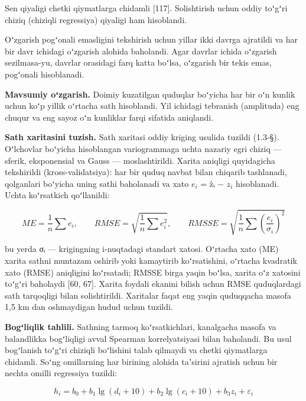 \documentclass[14pt,a4paper,oneside]{extreport}
\begin{document}
Sen qiyaligi chetki qiymatlarga chidamli {[}117{]}. Solishtirish uchun
oddiy toʻgʻri chiziq (chiziqli regressiya) qiyaligi ham hisoblandi.

Oʻzgarish pogʻonali emasligini tekshirish uchun yillar ikki davrga
ajratildi va har bir davr ichidagi oʻzgarish alohida baholandi. Agar
davrlar ichida oʻzgarish sezilmasa-yu, davrlar orasidagi farq katta
boʻlsa, oʻzgarish bir tekis emas, pogʻonali hisoblanadi.

\textbf{Mavsumiy oʻzgarish.} Doimiy kuzatilgan quduqlar boʻyicha har bir
oʻn kunlik uchun koʻp yillik oʻrtacha sath hisoblandi. Yil ichidagi
tebranish (amplituda) eng chuqur va eng sayoz oʻn kunliklar farqi
sifatida aniqlandi.

\textbf{Sath xaritasini tuzish.} Sath xaritasi oddiy kriging usulida
tuzildi (1.3-§). Oʻlchovlar boʻyicha hisoblangan variogrammaga uchta
nazariy egri chiziq --- sferik, eksponensial va Gauss ---
moslashtirildi. Xarita aniqligi quyidagicha tekshirildi
(kross-validatsiya): har bir quduq navbat bilan chiqarib tashlanadi,
qolganlari boʻyicha uning sathi baholanadi va xato $e_{i}$ = ẑᵢ − $z_{i}$
hisoblanadi. Uchta koʻrsatkich qoʻllanildi:

\begin{equation}\tag{2.9}
ME = \frac{1}{n}\sum e_i, \qquad RMSE = \sqrt{\frac{1}{n}\sum e_i^2}, \qquad RMSSE = \sqrt{\frac{1}{n}\sum \left(\frac{e_i}{\sigma_i}\right)^2}
\end{equation}

bu yerda σᵢ --- krigingning i-nuqtadagi standart xatosi. Oʻrtacha xato
(ME) xarita sathni muntazam oshirib yoki kamaytirib koʻrsatishini,
oʻrtacha kvadratik xato (RMSE) aniqligini koʻrsatadi; RMSSE birga yaqin
boʻlsa, xarita oʻz xatosini toʻgʻri baholaydi {[}60, 67{]}. Xarita
foydali ekanini bilish uchun RMSE quduqlardagi sath tarqoqligi bilan
solishtirildi. Xaritalar faqat eng yaqin quduqqacha masofa 1,5 km dan
oshmaydigan hudud uchun tuzildi.

\textbf{Bogʻliqlik tahlili.} Sathning tarmoq koʻrsatkichlari, kanalgacha
masofa va balandlikka bogʻliqligi avval Spearman korrelyatsiyasi bilan
baholandi. Bu usul bogʻlanish toʻgʻri chiziqli boʻlishini talab qilmaydi
va chetki qiymatlarga chidamli. Soʻng omillarning har birining alohida
taʼsirini ajratish uchun bir nechta omilli regressiya tuzildi:

\begin{equation}\tag{2.10}
h_i = b_0 + b_1 \lg(d_i + 10) + b_2 \lg(c_i + 10) + b_3 z_i + \varepsilon_i
\end{equation}
\end{document}
